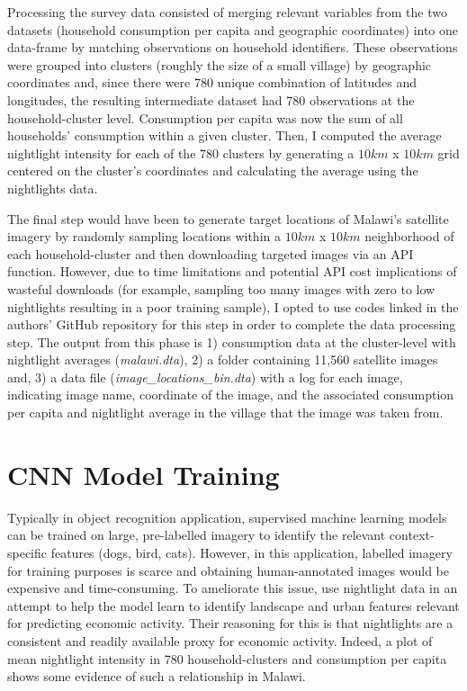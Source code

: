\documentclass[11pt, a4paper, leqno]{article}
\begin{document}
 Processing the survey data consisted of merging relevant variables from the two datasets (household consumption per capita and geographic coordinates) into one data-frame by matching observations on household identifiers. These observations were grouped into clusters (roughly the size of a small village) by geographic coordinates and, since there were 780 unique combination of latitudes and longitudes, the resulting intermediate dataset had 780 observations at the household-cluster level. Consumption per capita was now the sum of all households' consumption within a given cluster. Then, I computed the average nightlight intensity for each of the 780 clusters by generating a $10 km$ x $10 km$ grid centered on the cluster's coordinates and calculating the average using the nightlights data. 

 The final step would have been to generate target locations of Malawi's satellite imagery by randomly sampling locations within a $10km$ x $10km$ neighborhood of each household-cluster and then downloading  targeted images via an API function. However, due to time limitations and potential API cost implications of wasteful downloads (for example, sampling too many images with zero to low nightlights resulting in a poor training sample), I opted to use codes linked in the authors' GitHub repository for this step in order to complete the data processing step. The output from this phase is 1) consumption data at the cluster-level with nightlight averages (\textit{malawi.dta}), 2) a folder containing 11,560 satellite images and, 3) a data file (\textit{image\_locations\_bin.dta}) with a log for each image, indicating image name, coordinate of the image, and the associated consumption per capita and  nightlight average in the village that the image was taken from.

\section{CNN Model Training}

 Typically in object recognition application, supervised machine learning models can be trained on large, pre-labelled imagery to identify the relevant context-specific features (dogs, bird, cats). However, in this application, labelled imagery for training purposes is scarce and obtaining human-annotated images would be expensive and time-consuming. To ameliorate this issue, \citet{jean2016combining} use nightlight data in an attempt to help the model learn to identify landscape and urban features relevant for predicting economic activity. Their reasoning for this is that nightlights are a consistent and readily available proxy for economic activity. Indeed, a plot of mean nightlight intensity in 780 household-clusters and consumption per capita shows some evidence of such a relationship in Malawi.
\end{document}
